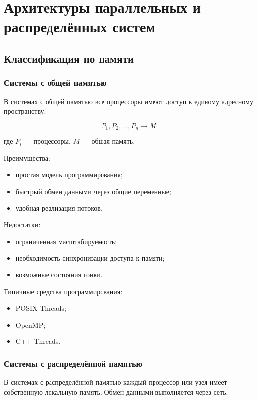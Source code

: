 \documentclass[12pt,a4paper]{article}
\begin{document}
\section{Архитектуры параллельных и распределённых систем}

\subsection{Классификация по памяти}

\subsubsection{Системы с общей памятью}

В системах с общей памятью все процессоры имеют доступ к единому адресному пространству.

\[
P_1, P_2, \ldots, P_n \longrightarrow M
\]

где $P_i$ --- процессоры, $M$ --- общая память.

Преимущества:
\begin{itemize}
    \item простая модель программирования;
    \item быстрый обмен данными через общие переменные;
    \item удобная реализация потоков.
\end{itemize}

Недостатки:
\begin{itemize}
    \item ограниченная масштабируемость;
    \item необходимость синхронизации доступа к памяти;
    \item возможные состояния гонки.
\end{itemize}

Типичные средства программирования:
\begin{itemize}
    \item POSIX Threads;
    \item OpenMP;
    \item C++ Threads.
\end{itemize}

\subsubsection{Системы с распределённой памятью}

В системах с распределённой памятью каждый процессор или узел имеет собственную локальную память. Обмен данными выполняется через сеть.
\end{document}
